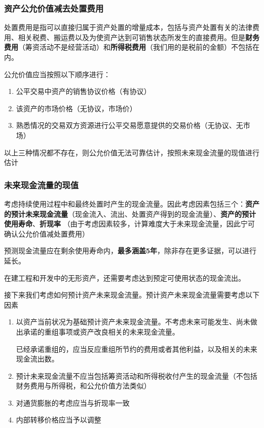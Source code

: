 \documentclass[UTF8,12pt]{ctexart}
\numberwithin{equation}{section} %
\numberwithin{figure}{section}
\numberwithin{table}{section}
\begin{document}
	\subsubsection{资产公允价值减去处置费用}
	处置费用是指可以直接归属于资产处置的增量成本，包括与资产处置有关的法律费用、相关税费、搬运费以及为使资产达到可销售状态所发生的直接费用。但是\textbf{财务费用}（筹资活动不是经营活动）和\textbf{所得税费用}（我们用的是税前的金额）不包括在内。
	
	公允价值应当按照以下顺序进行：
	\begin{enumerate}
		\item 公平交易中资产的销售协议价格（有协议）
		
		\item 该资产的市场价格（无协议，市场价）
		
		\item 熟悉情况的交易双方资源进行公平交易愿意提供的交易价格（无协议、无市场）
	\end{enumerate}
	以上三种情况都不存在，则公允价值无法可靠估计，按照未来现金流量的现值进行估计
	
	\subsubsection{未来现金流量的现值}
	考虑持续使用过程中和最终处置时产生的现金流量。因此考虑因素包括三个：\textbf{资产的预计未来现金流量}（现金流入、流出、处置资产得到的现金流量）、\textbf{资产的预计使用寿命}、\textbf{折现率} （由于考虑因素较多，计算难度大于未来现金流量，因此宁可确认公允价值减处置费用）
	
	预测现金流量应在剩余使用寿命内，\textbf{最多涵盖5年}，除非存在更多证据，可以进行延长。
	
	在建工程和开发中的无形资产，还需要考虑达到预定可使用状态的现金流出。
	
	接下来我们考虑如何预计资产未来现金流量。预计资产未来现金流量需要考虑以下因素
	\begin{enumerate}
		\item 以资产当前状况为基础预计资产未来现金流量。不考虑未来可能发生、尚未做出承诺的重组事项或资产改良相关的未来现金流量。
		
		已经承诺重组的，应当反应重组所节约的费用或者其他利益，以及相关的未来现金流出数。
		
		\item 预计未来现金流量不应当包括筹资活动和所得税收付产生的现金流量（不包括财务费用与所得税，和公允价值方法类似）
		
		\item 对通货膨胀的考虑应当与折现率一致
		
		\item 内部转移价格应当予以调整
	\end{enumerate}
	
\end{document}
